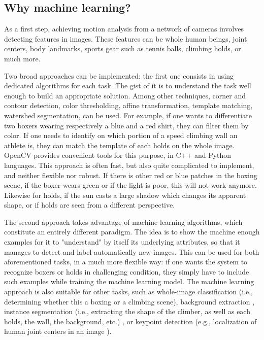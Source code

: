 \subsection{Why machine learning?}

As a first step, achieving motion analysis from a network of cameras involves detecting features in images. These features can be whole human beings, joint centers, body landmarks, sports gear such as tennis balls, climbing holds, or much more. 

Two broad approaches can be implemented: the first one consists in using dedicated algorithms for each task. The gist of it is to understand the task well enough to build an appropriate solution. Among other techniques, corner and contour detection, color thresholding, affine transformation, template matching, watershed segmentation, can be used. For example, if one wants to differentiate two boxers wearing respectively a blue and a red shirt, they can filter them by color. If one needs to identify on which portion of a speed climbing wall an athlete is, they can match the template of each holds on the whole image. OpenCV \cite{Bradski2000} provides convenient tools for this purpose, in C++ and Python languages. This approach is often fast, but also quite complicated to implement, and neither flexible nor robust. If there is other red or blue patches in the boxing scene, if the boxer wears green or if the light is poor, this will not work anymore. Likewise for holds, if the sun casts a large shadow which changes its apparent shape, or if holds are seen from a different perspective.

The second approach takes advantage of machine learning algorithms, which constitute an entirely different paradigm. The idea is to show the machine enough examples for it to "understand" by itself its underlying attributes, so that it manages to detect and label automatically new images. This can be used for both aforementioned tasks, in a much more flexible way: if one wants the system to recognize boxers or holds in challenging condition, they simply have to include such examples while training the machine learning model. The machine learning approach is also suitable for other tasks, such as whole-image classification (i.e., determining whether this a boxing or a climbing scene), background extraction \cite{Bouwmans2019}, instance segmentation (i.e., extracting the shape of the climber, as well as each holds, the wall, the background, etc.) \cite{Minaee2021}, or keypoint detection (e.g., localization of human joint centers in an image \cite{Chen2020}). 


